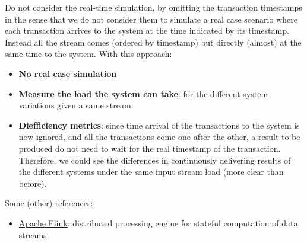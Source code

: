 \documentclass{article}
\begin{document}
Do not consider the real-time simulation, by omitting the transaction timestamps in the sense that we do not consider them to simulate a real case scenario where each transaction arrives to the system at the time indicated by its timestamp. 
Instead all the stream comes (ordered by timestamp) but directly (almost) at the same time to the system. With this approach:
\begin{itemize}
  \item \textbf{No real case simulation}
  \item \textbf{Measure the load the system can take}: for the different system variations given a same stream.
  \item \textbf{Diefficiency metrics}: since time arrival of the transactions to the system is now ignored, and all the transactions come one after the other, a result to be produced do not need to wait for the real timestamp of the transaction. Therefore, we could see the differences in continuously delivering results of the different systems under the same input stream load (more clear than before).
\end{itemize}

Some (other) references:

\begin{itemize}
  \item \href{https://www.confluent.io/es-es/learn/apache-flink/}{Apache Flink}: distributed processing engine for stateful computation of data streams.
\end{itemize}

\end{document}
